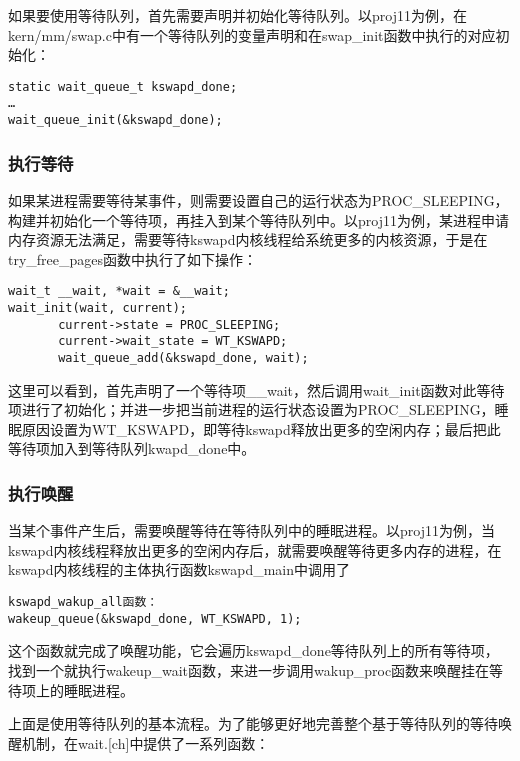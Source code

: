 如果要使用等待队列，首先需要声明并初始化等待队列。以proj11为例，在kern/mm/swap.c中有一个等待队列的变量声明和在swap\_init函数中执行的对应初始化：

\begin{lstlisting}
static wait_queue_t kswapd_done;
…
wait_queue_init(&kswapd_done);
\end{lstlisting}

\subsubsection{执行等待}\label{ux6267ux884cux7b49ux5f85}

如果某进程需要等待某事件，则需要设置自己的运行状态为PROC\_SLEEPING，构建并初始化一个等待项，再挂入到某个等待队列中。以proj11为例，某进程申请内存资源无法满足，需要等待kswapd内核线程给系统更多的内核资源，于是在try\_free\_pages函数中执行了如下操作：

\begin{lstlisting}
wait_t __wait, *wait = &__wait;
wait_init(wait, current);
       current->state = PROC_SLEEPING;
       current->wait_state = WT_KSWAPD;
       wait_queue_add(&kswapd_done, wait);
\end{lstlisting}

这里可以看到，首先声明了一个等待项\_\_wait，然后调用wait\_init函数对此等待项进行了初始化；并进一步把当前进程的运行状态设置为PROC\_SLEEPING，睡眠原因设置为WT\_KSWAPD，即等待kswapd释放出更多的空闲内存；最后把此等待项加入到等待队列kwapd\_done中。

\subsubsection{执行唤醒}\label{ux6267ux884cux5524ux9192}

当某个事件产生后，需要唤醒等待在等待队列中的睡眠进程。以proj11为例，当kswapd内核线程释放出更多的空闲内存后，就需要唤醒等待更多内存的进程，在kswapd内核线程的主体执行函数kswapd\_main中调用了

\begin{lstlisting}
kswapd_wakup_all函数：
wakeup_queue(&kswapd_done, WT_KSWAPD, 1);
\end{lstlisting}

这个函数就完成了唤醒功能，它会遍历kswapd\_done等待队列上的所有等待项，找到一个就执行wakeup\_wait函数，来进一步调用wakup\_proc函数来唤醒挂在等待项上的睡眠进程。

上面是使用等待队列的基本流程。为了能够更好地完善整个基于等待队列的等待唤醒机制，在wait.{[}ch{]}中提供了一系列函数：


